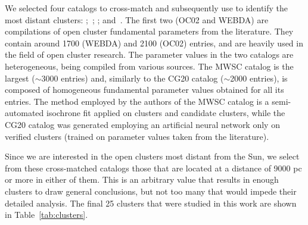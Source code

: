 \documentclass{aa}
\begin{document}
 We selected four catalogs to cross-match and subsequently use to identify the
 most distant clusters: \citet[][the New Catalog of Optically Visible Open Clusters
 and Candidates, hereafter OC02]{Dias_2002};~\citet[][hereafter
 WEBDA\footnote{\url{https://webda.physics.muni.cz/}}]{Netopil_2012};
 \citet[][Milky Way Star Clusters Catalog, hereafter MWSC]{Kharchenko_2012};
 and~\citet[][hereafter CG20]{Cantat_2020}.
 The first two (OC02 and WEBDA) are compilations of open cluster fundamental
 parameters from the literature. They contain around 1700 (WEBDA) and 2100 
 (OC02) entries, and are heavily used in the field of open cluster research.
 The parameter values in the two catalogs are heterogeneous, being compiled from
 various sources.
 The MWSC catalog is the largest  ($\sim$3000 entries) and, similarly to the
 CG20 catalog ($\sim$2000 entries), is composed of homogeneous fundamental
 parameter values obtained for all its entries.
 The method employed by the authors of the MWSC catalog is a semi-automated
 isochrone fit applied on clusters and candidate clusters, while the
 CG20 catalog was generated employing an artificial neural network only on
 verified clusters  (trained on parameter values taken from the
 literature).

 Since we are interested in the open clusters most distant from the Sun, we
 select from these cross-matched catalogs those that are located at a
 distance of 9000 pc or more in either of them. This is an arbitrary value that
 results in enough clusters to draw general conclusions, but not too many that
 would impede their detailed analysis. The final 25 clusters that were
 studied in this work are shown in Table~\ref{tab:clusters}.\\
\end{document}
